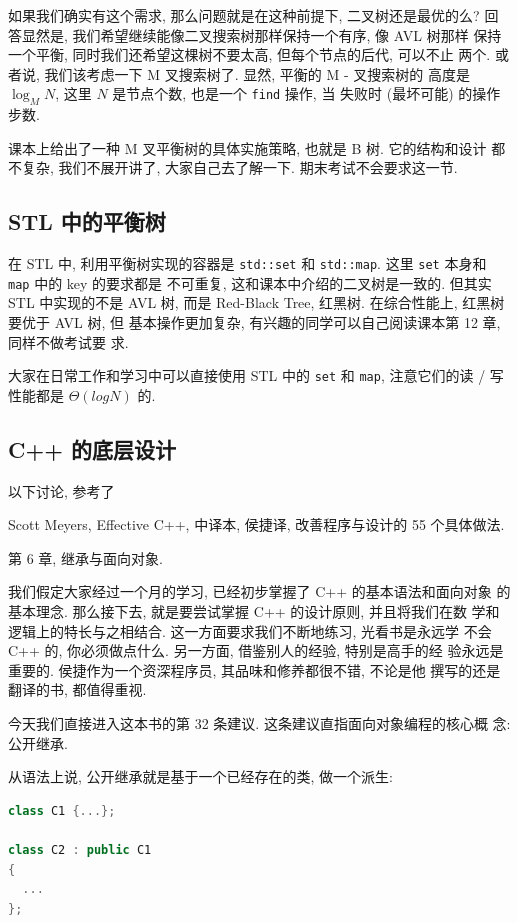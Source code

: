 \documentclass[a4paper]{ctexart}
\theoremstyle{definition}
\theoremstyle{definition}
\begin{document}
如果我们确实有这个需求, 那么问题就是在这种前提下, 二叉树还是最优的么?
回答显然是, 我们希望继续能像二叉搜索树那样保持一个有序, 像 AVL 树那样
保持一个平衡, 同时我们还希望这棵树不要太高, 但每个节点的后代, 可以不止
两个. 或者说, 我们该考虑一下 M 叉搜索树了. 显然, 平衡的 M - 叉搜索树的
高度是 $\log_M N$, 这里 $N$ 是节点个数, 也是一个 \verb|find| 操作, 当
失败时 (最坏可能) 的操作步数. 

课本上给出了一种 M 叉平衡树的具体实施策略, 也就是 B 树. 它的结构和设计
都不复杂, 我们不展开讲了, 大家自己去了解一下. 期末考试不会要求这一节.

\subsection{STL 中的平衡树}

在 STL 中, 利用平衡树实现的容器是 \verb|std::set| 和
\verb|std::map|. 这里 \verb|set| 本身和 \verb|map| 中的 key 的要求都是
不可重复, 这和课本中介绍的二叉树是一致的. 但其实 STL 中实现的不是 AVL
树, 而是 Red-Black Tree, 红黑树. 在综合性能上, 红黑树要优于 AVL 树, 但
基本操作更加复杂, 有兴趣的同学可以自己阅读课本第 12 章, 同样不做考试要
求.

大家在日常工作和学习中可以直接使用 STL 中的 \verb|set| 和 \verb|map|,
注意它们的读 / 写性能都是 $\Theta(log N)$ 的.

\subsection{C++ 的底层设计}

以下讨论, 参考了

Scott Meyers, Effective C++, 中译本, 侯捷译, 改善程序与设计的 55 个具体做法.

第 6 章, 继承与面向对象.

我们假定大家经过一个月的学习, 已经初步掌握了 C++ 的基本语法和面向对象
的基本理念. 那么接下去, 就是要尝试掌握 C++ 的设计原则, 并且将我们在数
学和逻辑上的特长与之相结合. 这一方面要求我们不断地练习, 光看书是永远学
不会 C++ 的, 你必须做点什么. 另一方面, 借鉴别人的经验, 特别是高手的经
验永远是重要的. 侯捷作为一个资深程序员, 其品味和修养都很不错, 不论是他
撰写的还是翻译的书, 都值得重视.

今天我们直接进入这本书的第 32 条建议. 这条建议直指面向对象编程的核心概
念: 公开继承.

从语法上说, 公开继承就是基于一个已经存在的类, 做一个派生:

\begin{lstlisting}[language=C++]
class C1 {...};

class C2 : public C1
{
  ...
};
\end{lstlisting}
\end{document}
